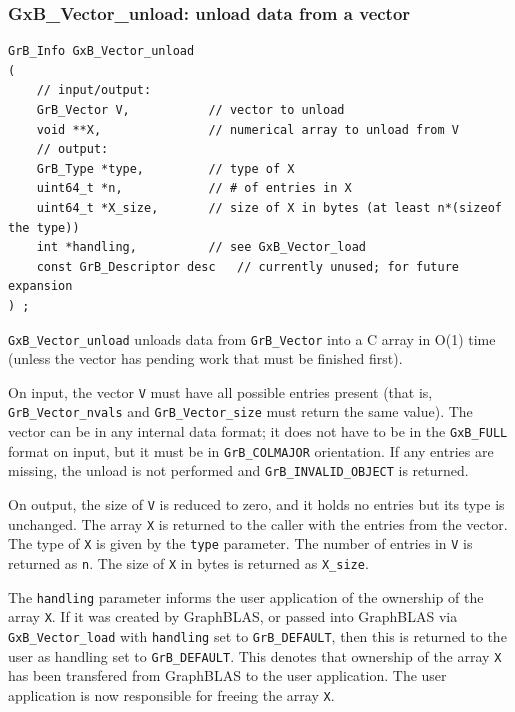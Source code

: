 \subsubsection{{\sf GxB\_Vector\_unload:} unload data from a vector}
\label{vector_unload}

\begin{mdframed}[userdefinedwidth=6in]
{\footnotesize
\begin{verbatim}
GrB_Info GxB_Vector_unload
(
    // input/output:
    GrB_Vector V,           // vector to unload
    void **X,               // numerical array to unload from V
    // output:
    GrB_Type *type,         // type of X
    uint64_t *n,            // # of entries in X
    uint64_t *X_size,       // size of X in bytes (at least n*(sizeof the type))
    int *handling,          // see GxB_Vector_load
    const GrB_Descriptor desc   // currently unused; for future expansion
) ;
\end{verbatim}
} \end{mdframed}

\verb'GxB_Vector_unload' unloads data from \verb'GrB_Vector' into a C array in
O(1) time (unless the vector has pending work that must be finished first).

On input, the vector \verb'V' must have all possible entries present (that is,
\verb'GrB_Vector_nvals' and \verb'GrB_Vector_size' must return the same value).
The vector can be in any internal data format; it does not have to be in the
\verb'GxB_FULL' format on input, but it must be in \verb'GrB_COLMAJOR'
orientation.  If any entries are missing, the unload is not performed and
\verb'GrB_INVALID_OBJECT' is returned.

On output, the size of \verb'V' is reduced to zero, and it holds no entries but
its type is unchanged.  The array \verb'X' is returned to the caller with the
entries from the vector.  The type of \verb'X' is given by the \verb'type'
parameter.  The number of entries in \verb'V' is returned as \verb'n'.
The size of \verb'X' in bytes is returned as \verb'X_size'.

The \verb'handling' parameter informs the user application of the ownership of
the array \verb'X'.  If it was created by GraphBLAS, or passed into GraphBLAS
via \verb'GxB_Vector_load' with \verb'handling' set to \verb'GrB_DEFAULT', then
this is returned to the user as handling set to \verb'GrB_DEFAULT'.  This
denotes that ownership of the array \verb'X' has been transfered from GraphBLAS
to the user application.  The user application is now responsible for freeing
the array \verb'X'.

